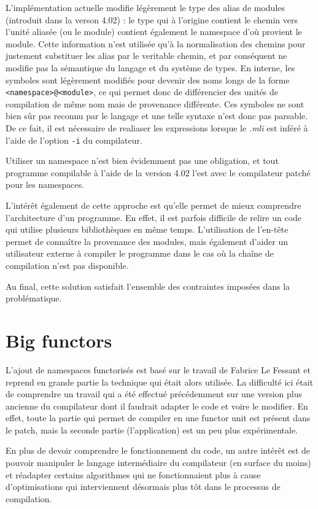 \documentclass[11pt,a4paper]{report}
\begin{document}
L'implémentation actuelle modifie légèrement le type des alias de modules
(introduit dans la verson 4.02) : le type qui à l'origine contient le chemin
vers l'unité aliasée (ou le module) contient également le namespace d'où
provient le module. Cette information n'est utilisée qu'à la normalisation des
chemins pour justement substituer les alias par le veritable chemin, et par
conséquent ne modifie pas la sémantique du langage et du système de types.
En interne, les symboles sont légèrement modifiés pour devenir des noms longs de
la forme \texttt{<namespace>@<module>}, ce qui permet donc de différencier des
unités de compilation de même nom mais de provenance différente. Ces symboles ne
sont bien sûr pas reconnu par le langage et une telle syntaxe n'est donc pas
parsable. De ce fait, il est nécessaire de realiaser les expressions lorsque le
\emph{.mli} est inféré à l'aide de l'option \texttt{-i} du compilateur.

Utiliser un namespace n'est bien évidemment pas une obligation, et tout
programme compilable à l'aide de la version 4.02 l'est avec le compilateur
patché pour les namespaces.

L'intérêt également de cette approche est qu'elle permet de mieux comprendre
l'architecture d'un programme. En effet, il est parfois difficile de relire un
code qui utilise plusieurs bibliothèques en même temps. L'utilisation de
l'en-tête permet de connaître la provenance des modules, mais également d'aider
un utilisateur externe à compiler le programme dans le cas où la chaîne de
compilation n'est pas disponible.

Au final, cette solution satisfait l'ensemble des contraintes imposées dans la
problématique.

\section{Big functors}

L'ajout de namespaces functorisés est basé sur le travail de Fabrice Le Fessant
\cite{lefessant-bigfunctors} et reprend en grande partie la technique qui était
alors utilisée. La difficulté ici était de comprendre un travail qui a été
effectué précédemment sur une version plus ancienne du compilateur dont il
faudrait adapter le code et voire le modifier. En effet, toute la partie qui
permet de compiler en une functor unit est présent dans le patch, mais la
seconde partie (l'application) est un peu plus expérimentale.

En plus de devoir comprendre le fonctionnement du code, un autre intérêt est de
pouvoir manipuler le langage intermédiaire du compilateur (en surface du moins)
et réadapter certains algorithmes qui ne fonctionnaient plus à cause
d'optimisations qui interviennent désormais plus tôt dans le processus de
compilation.
\end{document}

